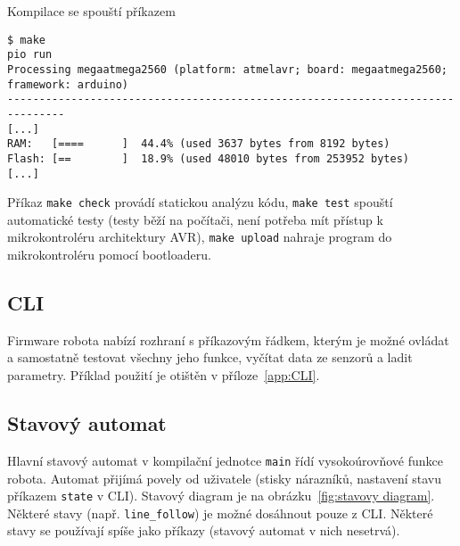 \documentclass[a4paper,11pt]{article}
\begin{document}
Kompilace se spouští příkazem
\begin{lstlisting}[style=terminal]
$ make
pio run
Processing megaatmega2560 (platform: atmelavr; board: megaatmega2560; framework: arduino)
-------------------------------------------------------------------------------
[...]
RAM:   [====      ]  44.4% (used 3637 bytes from 8192 bytes)
Flash: [==        ]  18.9% (used 48010 bytes from 253952 bytes)
[...]
\end{lstlisting}
Příkaz \texttt{make check} provádí statickou analýzu kódu, \texttt{make test}
spouští automatické testy (testy běží na počítači, není potřeba mít přístup
k mikrokontroléru architektury AVR), \texttt{make upload} nahraje program do
mikrokontroléru pomocí bootloaderu.


\subsection{CLI}
Firmware robota nabízí rozhraní s příkazovým řádkem, kterým je možné
ovládat a samostatně testovat všechny jeho funkce, vyčítat data ze
senzorů a ladit parametry. Příklad použití je otištěn
v příloze~\ref{app:CLI}.


\subsection{Stavový automat}
Hlavní stavový automat v kompilační jednotce \texttt{main} řídí vysokoúrovňové
funkce robota. Automat přijímá povely od uživatele (stisky nárazníků, nastavení
stavu příkazem \texttt{state} v CLI). Stavový diagram je na
obrázku~\ref{fig:stavovy diagram}. Některé stavy (např. \texttt{line\_follow})
je možné dosáhnout pouze z CLI. Některé stavy se používají spíše jako příkazy
(stavový automat v nich nesetrvá).
\end{document}
